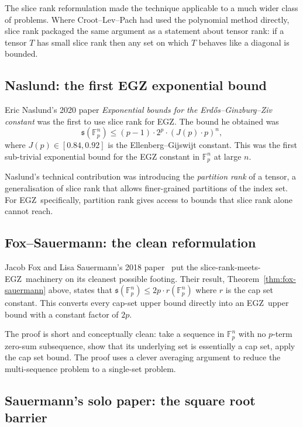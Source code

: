 \documentclass[11pt,a4paper]{article}
\theoremstyle{plain}
\theoremstyle{definition}
\theoremstyle{remark}
\newcommand{\F}{\mathbb{F}}
\newcommand{\sUFp}{\mathfrak{s}}
\newcommand{\EGZ}{\textsf{EGZ}}
\begin{document}
The slice rank reformulation made the technique applicable to a much wider class of problems. Where Croot--Lev--Pach had used the polynomial method directly, slice rank packaged the same argument as a statement about tensor rank: if a tensor $T$ has small slice rank then any set on which $T$ behaves like a diagonal is bounded.

\subsection{Naslund: the first EGZ exponential bound}

Eric Naslund's 2020 paper \emph{Exponential bounds for the Erd\H{o}s--Ginzburg--Ziv constant} \cite{naslund2020} was the first to use slice rank for \EGZ. The bound he obtained was
\begin{equation}
\sUFp(\F_p^n) \leq (p-1) \cdot 2^p \cdot (J(p) \cdot p)^n,
\end{equation}
where $J(p) \in [0.84, 0.92]$ is the Ellenberg--Gijswijt constant. This was the first sub-trivial exponential bound for the EGZ constant in $\F_p^n$ at large $n$.

Naslund's technical contribution was introducing the \emph{partition rank} of a tensor, a generalisation of slice rank that allows finer-grained partitions of the index set. For \EGZ\ specifically, partition rank gives access to bounds that slice rank alone cannot reach.

\subsection{Fox--Sauermann: the clean reformulation}

Jacob Fox and Lisa Sauermann's 2018 paper~\cite{foxsauermann2018} put the slice-rank-meets-\EGZ\ machinery on its cleanest possible footing. Their result, Theorem~\ref{thm:fox-sauermann} above, states that $\sUFp(\F_p^n) \leq 2p \cdot r(\F_p^n)$ where $r$ is the cap set constant. This converts every cap-set upper bound directly into an \EGZ\ upper bound with a constant factor of $2p$.

The proof is short and conceptually clean: take a sequence in $\F_p^n$ with no $p$-term zero-sum subsequence, show that its underlying set is essentially a cap set, apply the cap set bound. The proof uses a clever averaging argument to reduce the multi-sequence problem to a single-set problem.

\subsection{Sauermann's solo paper: the square root barrier}
\end{document}
